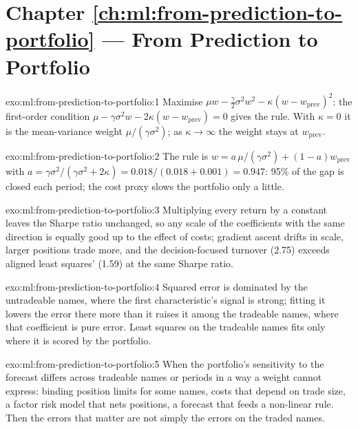 \section*{Chapter \ref{ch:ml:from-prediction-to-portfolio} --- From Prediction to Portfolio}

\begin{solution}{exo:ml:from-prediction-to-portfolio:1}
Maximise $\mu w - \frac\gamma2\sigma^2w^2 - \kappa(w - w_{\mathrm{prev}})^2$: the first-order condition $\mu - \gamma\sigma^2w -
2\kappa(w - w_{\mathrm{prev}}) = 0$ gives the rule. With $\kappa = 0$ it is the mean-variance weight $\mu/(\gamma\sigma^2)$; as
$\kappa\to\infty$ the weight stays at $w_{\mathrm{prev}}$.
\end{solution}

\begin{solution}{exo:ml:from-prediction-to-portfolio:2}
The rule is $w = a\,\mu/(\gamma\sigma^2) + (1 - a)w_{\mathrm{prev}}$ with $a = \gamma\sigma^2/(\gamma\sigma^2 + 2\kappa) =
0.018/(0.018 + 0.001) = 0.947$: 95\% of the gap is closed each period; the cost proxy slows the portfolio only a little.
\end{solution}

\begin{solution}{exo:ml:from-prediction-to-portfolio:3}
Multiplying every return by a constant leaves the Sharpe ratio unchanged, so any scale of the coefficients with the same
direction is equally good up to the effect of costs; gradient ascent drifts in scale, larger positions trade more, and the
decision-focused turnover (2.75) exceeds aligned least squares' (1.59) at the same Sharpe ratio.
\end{solution}

\begin{solution}{exo:ml:from-prediction-to-portfolio:4}
Squared error is dominated by the untradeable names, where the first characteristic's signal is strong; fitting it lowers the
error there more than it raises it among the tradeable names, where that coefficient is pure error. Least squares on the
tradeable names fits only where it is scored by the portfolio.
\end{solution}

\begin{solution}{exo:ml:from-prediction-to-portfolio:5}
When the portfolio's sensitivity to the forecast differs across tradeable names or periods in a way a weight cannot express:
binding position limits for some names, costs that depend on trade size, a factor risk model that nets positions, a
forecast that feeds a non-linear rule. Then the errors that matter are not simply the errors on the traded names.
\end{solution}

